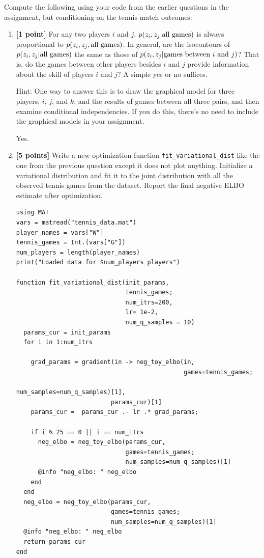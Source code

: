 \documentclass{article}
\begin{document}
Compute the following using your code from the earlier questions in the assignment, but conditioning on the tennis match outcomes:
\begin{enumerate}[label=(\alph*)]
\item {\bf [1 point]} For any two players $i$ and $j$, $p(z_i, z_j | \textnormal{all games})$ is always proportional to
	$p(z_i, z_j , \textnormal{all games})$.
	In general, are the isocontours of $p(z_i, z_j | \textnormal{all games})$ the same as those of
	$p(z_i, z_j | \textnormal{games between $i$ and $j$})$?  That is, do the games between
	other players besides $i$ and $j$ provide information about the skill of
	players $i$ and $j$?  A simple yes or no suffices.
	
	Hint: One way to answer this is to draw the graphical model for three players,
	$i$, $j$, and $k$, and the results of games between all three pairs, and then
	examine conditional independencies.  If you do this, there's no need to include
	the graphical models in your assignment.

        Yes.
        \pagebreak
\item {\bf [5 points]} Write a new optimization function \texttt{fit\_variational\_dist} like the one from the 
  previous question except it does not plot anything.
  Initialize a variational distribution and fit it to the joint distribution with all the observed tennis games from the dataset.
  Report the final negative ELBO estimate after optimization.

\begin{verbatim}
using MAT
vars = matread("tennis_data.mat")
player_names = vars["W"]
tennis_games = Int.(vars["G"])
num_players = length(player_names)
print("Loaded data for $num_players players")

function fit_variational_dist(init_params,
                              tennis_games;
                              num_itrs=200,
                              lr= 1e-2,
                              num_q_samples = 10)
  params_cur = init_params
  for i in 1:num_itrs

    grad_params = gradient(in -> neg_toy_elbo(in,
                                              games=tennis_games;
                                              num_samples=num_q_samples)[1],
                          params_cur)[1]
    params_cur =  params_cur .- lr .* grad_params;

    if i % 25 == 0 || i == num_itrs
      neg_elbo = neg_toy_elbo(params_cur,
                              games=tennis_games;
                              num_samples=num_q_samples)[1]
      @info "neg_elbo: " neg_elbo
    end
  end
  neg_elbo = neg_toy_elbo(params_cur,
                          games=tennis_games;
                          num_samples=num_q_samples)[1]
  @info "neg_elbo: " neg_elbo
  return params_cur
end


\end{verbatim}
\end{enumerate}
\end{document}
